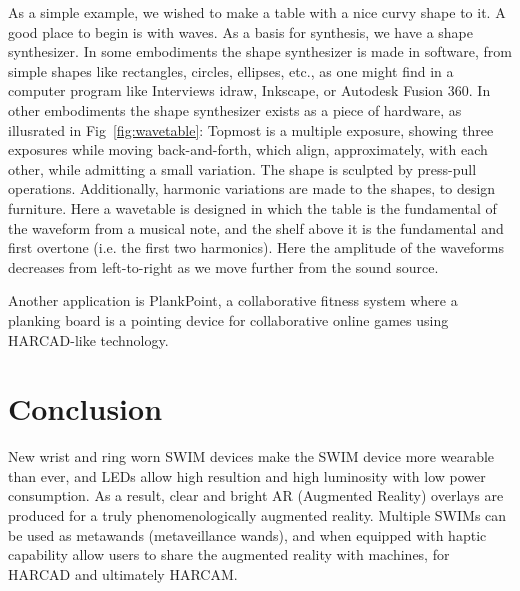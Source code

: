 \documentclass{sigchi-ext}
\begin{document}
As a simple example, we wished to make a table with a nice
curvy shape to it.  A good place to begin is with waves.
As a basis for synthesis, we have a shape synthesizer.
In some embodiments the shape synthesizer is made in software,
from simple shapes like rectangles, circles, ellipses, etc., as one
might find in a computer program like Interviews idraw,
Inkscape, or Autodesk Fusion 360.
In other embodiments the shape synthesizer exists as a piece of hardware,
as illusrated in Fig~\ref{fig:wavetable}:
Topmost is a multiple exposure, showing three exposures while
moving back-and-forth, which align, approximately, with each other,
while admitting a small variation.
The shape is sculpted by press-pull operations.
Additionally, harmonic variations are made to the shapes, to
design furniture.
Here a wavetable is designed in which the table is the
fundamental of the waveform from a musical note, and the shelf
above it is the fundamental and first overtone
(i.e. the first two harmonics).
Here the amplitude of the waveforms decreases from left-to-right
as we move further from the sound source.

Another application is PlankPoint\texttrademark,
a collaborative fitness system where
a planking board is a pointing device for collaborative online games
using HARCAD-like technology.

\section{Conclusion}
New wrist and ring worn SWIM devices make the SWIM device more wearable than
ever, and LEDs allow high resultion and high luminosity with low power
consumption. As a result, clear and bright AR (Augmented Reality)
overlays are produced
for a truly phenomenologically augmented reality.
Multiple SWIMs can be used as metawands (metaveillance wands), and when
equipped with haptic capability allow users to share the augmented reality
with machines, for HARCAD and ultimately HARCAM.


\balance{}



\end{document}
